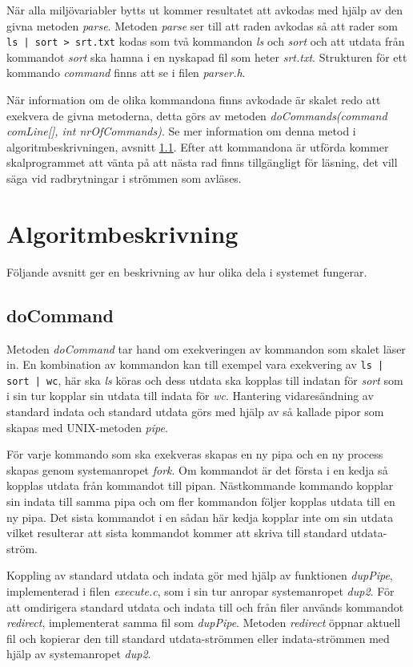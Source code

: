 \documentclass[a4paper, 12pt]{article}
\begin{document}
När alla miljövariabler bytts ut kommer resultatet att avkodas med
hjälp av den givna metoden \textit{parse}. Metoden \textit{parse} ser
till att raden avkodas så att rader som \verb!ls | sort > srt.txt!
kodas som två kommandon \textit{ls} och \textit{sort} och att utdata
från kommandot \textit{sort} ska hamna i en nyskapad fil som heter
\textit{srt.txt}. Strukturen för ett kommando \textit{command} finns
att se i filen \textit{parser.h}.

När information om de olika kommandona finns avkodade är skalet redo
att exekvera de givna metoderna, detta görs av metoden
\textit{doCommands(command comLine[], int nrOfCommands)}. Se mer
information om denna metod i algoritmbeskrivningen, avsnitt
\ref{sec:doCommand}. Efter att kommandona är utförda kommer
skalprogrammet att vänta på att nästa rad finns tillgängligt för
läsning, det vill säga vid radbrytningar i strömmen som avläses.

\section{Algoritmbeskrivning}\label{sec:algoritmbeskrivning}
Följande avsnitt ger en beskrivning av hur olika dela i systemet
fungerar.

\subsection{doCommand}\label{sec:doCommand}
Metoden \textit{doCommand} tar hand om exekveringen av kommandon som
skalet läser in. En kombination av kommandon kan till exempel vara
exekvering av \verb!ls | sort | wc!, här ska \textit{ls} köras och dess
utdata ska kopplas till indatan för \textit{sort} som i sin tur
kopplar sin utdata till indata för \textit{wc}. Hantering
vidaresändning av standard indata och standard utdata görs med hjälp
av så kallade pipor som skapas med UNIX-metoden \textit{pipe}.

För varje kommando som ska exekveras skapas en ny pipa och en ny
process skapas genom systemanropet \textit{fork}. Om kommandot är det
första i en kedja så kopplas utdata från kommandot till pipan.
Nästkommande kommando kopplar sin indata till samma pipa och om fler
kommandon följer kopplas utdata till en ny pipa. Det sista kommandot i
en sådan här kedja kopplar inte om sin utdata vilket resulterar att
sista kommandot kommer att skriva till standard utdata-ström.

Koppling av standard utdata och indata gör med hjälp av funktionen
\textit{dupPipe}, implementerad i filen \textit{execute.c}, som i sin
tur anropar systemanropet \textit{dup2}. För att omdirigera standard
utdata och indata till och från filer används kommandot
\textit{redirect}, implementerat samma fil som \textit{dupPipe}.
Metoden \textit{redirect} öppnar aktuell fil och kopierar den till
standard utdata-strömmen eller indata-strömmen med hjälp av
systemanropet \textit{dup2}.
\end{document}

